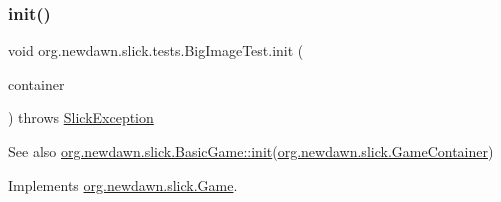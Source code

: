 \subsubsection{\texorpdfstring{init()}{init()}}
{\footnotesize\ttfamily void org.\+newdawn.\+slick.\+tests.\+Big\+Image\+Test.\+init (\begin{DoxyParamCaption}\item[{\mbox{\hyperlink{classorg_1_1newdawn_1_1slick_1_1_game_container}{Game\+Container}}}]{container }\end{DoxyParamCaption}) throws \mbox{\hyperlink{classorg_1_1newdawn_1_1slick_1_1_slick_exception}{Slick\+Exception}}\hspace{0.3cm}{\ttfamily [inline]}}

\begin{DoxySeeAlso}{See also}
\mbox{\hyperlink{classorg_1_1newdawn_1_1slick_1_1_basic_game_a8af0900217e4d389249f71367b22d114}{org.\+newdawn.\+slick.\+Basic\+Game\+::init}}(\mbox{\hyperlink{classorg_1_1newdawn_1_1slick_1_1_game_container}{org.\+newdawn.\+slick.\+Game\+Container}}) 
\end{DoxySeeAlso}


Implements \mbox{\hyperlink{interfaceorg_1_1newdawn_1_1slick_1_1_game_ad2dd6affab08bb8fdb5fab0815957b7a}{org.\+newdawn.\+slick.\+Game}}.


